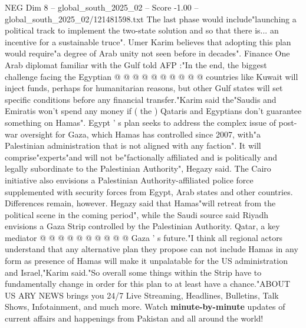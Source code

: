\begin{textsample}{NEG Dim 8 – global\_south\_2025\_02 – Score -1.00 – global\_south\_2025\_02/121481598.txt}
The last phase would include"launching a political track to implement the two-state solution and so that there is... an incentive for a sustainable truce".
Umer Karim believes that adopting this plan would require"a degree of Arab unity not seen before in decades".
Finance One Arab diplomat familiar with the Gulf told AFP :"In the end, the biggest challenge facing the Egyptian @ @ @ @ @ @ @ @ @ @ countries like Kuwait will inject funds, perhaps for humanitarian reasons, but other Gulf states will set specific conditions before any financial transfer."Karim said the"Saudis and Emiratis won't spend any money if ( the ) Qataris and Egyptians don't guarantee something on Hamas".
Egypt ' s plan seeks to address the complex issue of post-war oversight for Gaza, which Hamas has controlled since 2007, with"a Palestinian administration that is not aligned with any faction".
It will comprise"experts"and will not be"factionally affiliated and is politically and legally subordinate to the Palestinian Authority", Hegazy said.
The Cairo initiative also envisions a Palestinian Authority-affiliated police force supplemented with security forces from Egypt, Arab states and other countries.
Differences remain, however.
Hegazy said that Hamas"will retreat from the political scene in the coming period", while the Saudi source said Riyadh envisions a Gaza Strip controlled by the Palestinian Authority.
Qatar, a key mediator @ @ @ @ @ @ @ @ @ @ Gaza ' s future."I think all regional actors understand that any alternative plan they propose can not include Hamas in any form as presence of Hamas will make it unpalatable for the US administration and Israel,"Karim said."So overall some things within the Strip have to fundamentally change in order for this plan to at least have a chance."ABOUT US ARY NEWS brings you 24/7 Live Streaming, Headlines, Bulletins, Talk Shows, Infotainment, and much more.
Watch \textbf{minute-by-minute} updates of current affairs and happenings from Pakistan and all around the world!

\end{textsample}
